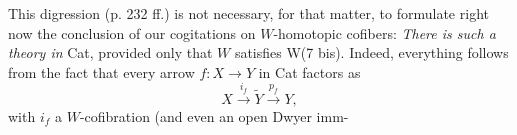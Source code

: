 \documentclass[11pt]{article}
\begin{document}
This digression (p. 232 ff.) is not necessary, for that matter, to formulate right now the conclusion of our cogitations on $W$-homotopic cofibers: \textit{There is such a theory in} Cat, provided only that $W$ satisfies W(7 bis). Indeed, everything follows from the fact that every arrow $f : X \longrightarrow Y$ in Cat factors as
\[
X \xrightarrow{i_f} \tilde{Y} \xrightarrow{p_f} Y,
\]
with $i_f$ a $W$-cofibration (and even an open Dwyer imm-
\end{document}

